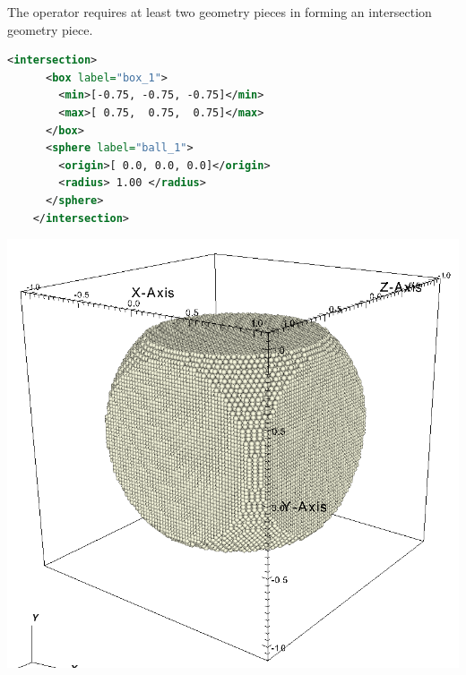 \begin{minipage}{0.6\textwidth}
  The  operator requires at least two geometry
  pieces in forming an intersection geometry piece.  
  \begin{lstlisting}[language=XML]
    <intersection>
      <box label="box_1">
        <min>[-0.75, -0.75, -0.75]</min>
        <max>[ 0.75,  0.75,  0.75]</max>
      </box>
      <sphere label="ball_1">
        <origin>[ 0.0, 0.0, 0.0]</origin>
        <radius> 1.00 </radius>
      </sphere>
    </intersection>
  \end{lstlisting}
\end{minipage}
\begin{minipage}{0.4\textwidth}
  \centering
  \includegraphics[width=0.7\columnwidth]{FIGS/geometry/geom_intersect.png}
\end{minipage}

